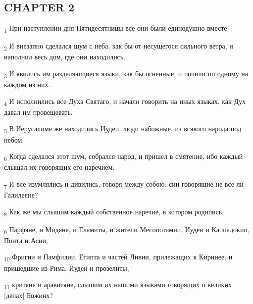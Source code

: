 \subsection{CHAPTER 2}
\begin{tcolorbox}
\textsubscript{1} При наступлении дня Пятидесятницы все они были единодушно вместе.
\end{tcolorbox}
\begin{tcolorbox}
\textsubscript{2} И внезапно сделался шум с неба, как бы от несущегося сильного ветра, и наполнил весь дом, где они находились.
\end{tcolorbox}
\begin{tcolorbox}
\textsubscript{3} И явились им разделяющиеся языки, как бы огненные, и почили по одному на каждом из них.
\end{tcolorbox}
\begin{tcolorbox}
\textsubscript{4} И исполнились все Духа Святаго, и начали говорить на иных языках, как Дух давал им провещевать.
\end{tcolorbox}
\begin{tcolorbox}
\textsubscript{5} В Иерусалиме же находились Иудеи, люди набожные, из всякого народа под небом.
\end{tcolorbox}
\begin{tcolorbox}
\textsubscript{6} Когда сделался этот шум, собрался народ, и пришел в смятение, ибо каждый слышал их говорящих его наречием.
\end{tcolorbox}
\begin{tcolorbox}
\textsubscript{7} И все изумлялись и дивились, говоря между собою: сии говорящие не все ли Галилеяне?
\end{tcolorbox}
\begin{tcolorbox}
\textsubscript{8} Как же мы слышим каждый собственное наречие, в котором родились.
\end{tcolorbox}
\begin{tcolorbox}
\textsubscript{9} Парфяне, и Мидяне, и Еламиты, и жители Месопотамии, Иудеи и Каппадокии, Понта и Асии,
\end{tcolorbox}
\begin{tcolorbox}
\textsubscript{10} Фригии и Памфилии, Египта и частей Ливии, прилежащих к Киринее, и пришедшие из Рима, Иудеи и прозелиты,
\end{tcolorbox}
\begin{tcolorbox}
\textsubscript{11} критяне и аравитяне, слышим их нашими языками говорящих о великих [делах] Божиих?
\end{tcolorbox}
